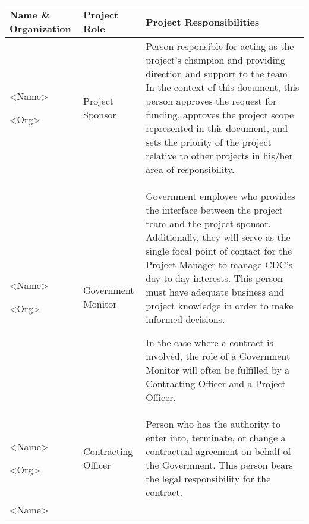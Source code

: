 \documentclass[a4paper, 11pt]{article}
\newcommand{\ra}[1]{\renewcommand{\arraystretch}{#1}}
\begin{document}
\ra{1.3}
\begin{longtable}[]{@{}lll@{}}
  \toprule
  \textbf{Name \& Organization} & \textbf{Project Role} & \textbf{Project
  Responsibilities}\tabularnewline
  \midrule
  \endhead
  \begin{minipage}[t]{0.30\columnwidth}\raggedright
  \textless{}Name\textgreater{}

  \textless{}Org\textgreater{}\strut
  \end{minipage} & \begin{minipage}[t]{0.30\columnwidth}\raggedright
  Project Sponsor\strut
  \end{minipage} & \begin{minipage}[t]{0.30\columnwidth}\raggedright
  Person responsible for acting as the project's champion and providing
  direction and support to the team. In the context of this document, this
  person approves the request for funding, approves the project scope
  represented in this document, and sets the priority of the project
  relative to other projects in his/her area of responsibility.\strut
  \end{minipage}\tabularnewline
  \begin{minipage}[t]{0.30\columnwidth}\raggedright
  \textless{}Name\textgreater{}

  \textless{}Org\textgreater{}\strut
  \end{minipage} & \begin{minipage}[t]{0.30\columnwidth}\raggedright
  Government Monitor\strut
  \end{minipage} & \begin{minipage}[t]{0.30\columnwidth}\raggedright
  Government employee who provides the interface between the project team
  and the project sponsor. Additionally, they will serve as the single
  focal point of contact for the Project Manager to manage CDC's
  day-to-day interests. This person must have adequate business and
  project knowledge in order to make informed decisions.

  In the case where a contract is involved, the role of a Government
  Monitor will often be fulfilled by a Contracting Officer and a Project
  Officer.\strut
  \end{minipage}\tabularnewline
  \begin{minipage}[t]{0.30\columnwidth}\raggedright
  \textless{}Name\textgreater{}

  \textless{}Org\textgreater{}\strut
  \end{minipage} & \begin{minipage}[t]{0.30\columnwidth}\raggedright
  Contracting Officer\strut
  \end{minipage} & \begin{minipage}[t]{0.30\columnwidth}\raggedright
  Person who has the authority to enter into, terminate, or change a
  contractual agreement on behalf of the Government. This person bears the
  legal responsibility for the contract.\strut
  \end{minipage}\tabularnewline
  \begin{minipage}[t]{0.30\columnwidth}\raggedright
  \textless{}Name\textgreater{}


\end{minipage}
\end{longtable}
\end{document}
